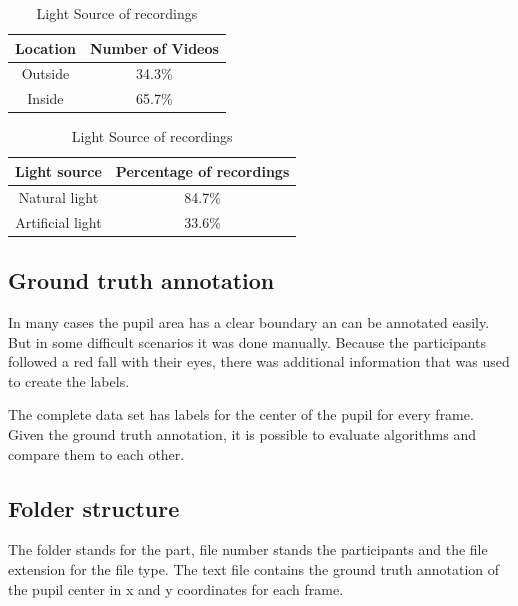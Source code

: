     \begin{table}[h]
      \centering 
      \begin{minipage}{0.7\textwidth}
        \centering
        \begin{tabular}{|c|c|}
          \hline
          Location & Number of Videos \\
          \hline
          Outside & 34.3\% \\
          Inside & 65.7\% \\
          \hline
        \end{tabular}
        \caption{Location of recordings}
        \label{tab:location}
      \end{minipage}\hfill
      \begin{minipage}{0.7\textwidth}
        \centering
        \begin{tabular}{|c|c|}
          \hline
          Light source & Percentage of recordings \\
          \hline
          Natural light & 84.7\% \\
          Artificial light & 33.6\% \\
          \hline
        \end{tabular}
        \caption{Light Source of recordings}
        \label{tab:light_source}
      \end{minipage}
    \end{table}

    \subsection{Ground truth annotation}
    In many cases the pupil area has a clear boundary an can be annotated easily. But in some difficult scenarios it was done manually. Because the participants followed a red fall with their eyes, there was additional information that was used to create the labels. 
    
    The complete data set has labels for the center of the pupil for every frame.
    Given the ground truth annotation, it is possible to evaluate algorithms and compare them to each other.
    \subsection{Folder structure}
    The folder stands for the part, file number stands the participants and the file extension for the file type. The text file contains the ground truth annotation of the pupil center in x and y coordinates for each frame.
    
